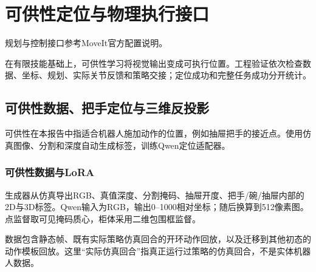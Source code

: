 \chapter{可供性定位与物理执行接口}
规划与控制接口参考MoveIt官方配置说明\cite{moveit}。


在有限技能基础上，可供性学习将视觉输出变成可执行位置。工程验证依次检查数据、坐标、规划、实际关节反馈和策略交接；定位成功和完整任务成功分开统计。

\section{可供性数据、把手定位与三维反投影}

\label{stage:s17}

可供性在本报告中指适合机器人施加动作的位置，例如抽屉把手的接近点。使用仿真图像、分割和深度自动生成标签，训练Qwen定位适配器。

\subsection{可供性数据与LoRA}\label{s17-detail-1}

生成器从仿真导出RGB、真值深度、分割掩码、抽屉开度、把手/碗/抽屉内部的2D与3D标签。Qwen输入为RGB，输出0--1000相对坐标；随后换算到512像素图。点监督取可见掩码质心，柜体采用二维包围框监督。

数据包含静态帧、既有实际策略仿真回合的开环动作回放，以及迁移到其他初态的动作模板回放。这里``实际仿真回合''指真正运行过策略的仿真回合，不是实体机器人数据。

